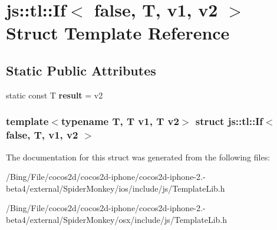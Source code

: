 \hypertarget{structjs_1_1tl_1_1_if_3_01false_00_01_t_00_01v1_00_01v2_01_4}{\section{js\-:\-:tl\-:\-:If$<$ false, T, v1, v2 $>$ Struct Template Reference}
\label{structjs_1_1tl_1_1_if_3_01false_00_01_t_00_01v1_00_01v2_01_4}
}
\subsection*{Static Public Attributes}
\begin{DoxyCompactItemize}
\item 
\hypertarget{structjs_1_1tl_1_1_if_3_01false_00_01_t_00_01v1_00_01v2_01_4_a61bbaca985984a7c701d0391eedbe9d1}{static const T {\bfseries result} = v2}\label{structjs_1_1tl_1_1_if_3_01false_00_01_t_00_01v1_00_01v2_01_4_a61bbaca985984a7c701d0391eedbe9d1}

\end{DoxyCompactItemize}
\subsubsection*{template$<$typename T, T v1, T v2$>$ struct js\-::tl\-::\-If$<$ false, T, v1, v2 $>$}



The documentation for this struct was generated from the following files\-:\begin{DoxyCompactItemize}
\item 
/\-Bing/\-File/cocos2d/cocos2d-\/iphone/cocos2d-\/iphone-\/2.-\/beta4/external/\-Spider\-Monkey/ios/include/js/Template\-Lib.\-h\item 
/\-Bing/\-File/cocos2d/cocos2d-\/iphone/cocos2d-\/iphone-\/2.-\/beta4/external/\-Spider\-Monkey/osx/include/js/Template\-Lib.\-h\end{DoxyCompactItemize}

